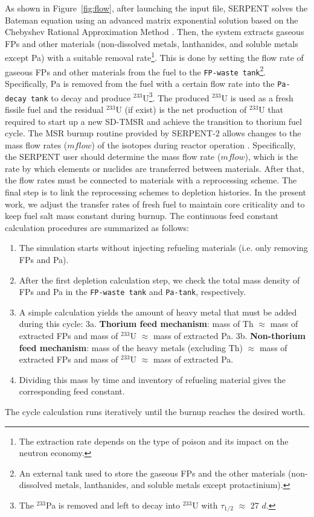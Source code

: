 As shown in Figure~\ref{fig:flow}, after launching the input file, SERPENT solves the Bateman equation using an advanced 
matrix exponential solution based on the Chebyshev Rational Approximation 
Method \cite{isotalo2016improving}. 
Then, the system extracts gaseous \gls{FPs} and other materials 
(non-dissolved metals, lanthanides, and soluble metals except Pa) with 
a suitable removal rate\footnote{The extraction rate depends on the type of 
poison and its impact on the neutron
economy.}. This is done by setting the 
flow rate of gaseous \gls{FPs} and other materials from the fuel to the 
\texttt{FP-waste tank}\footnote{An external tank used to store the gaseous 
\gls{FPs} and the other materials (non-dissolved metals, lanthanides, and 
soluble metals except protactinium).}. Specifically, Pa is removed 
from the fuel with a certain flow rate into the 
\texttt{Pa-decay tank} to decay and produce $^{233}$U\footnote{The 
$^{233}$Pa is removed and left to decay into $^{233}$U with $\tau_{1/2}$ 
$\approx$ $27$ $d$.}. The produced $^{233}$U is used as a fresh fissile fuel 
and the residual $^{233}$U (if exist) is the net production of $^{233}$U that required to start up a new SD-TMSR and achieve the transition to thorium fuel cycle. The MSR burnup 
routine provided by SERPENT-2 allows changes to the mass flow rates ($mflow$) of the 
isotopes during reactor operation \cite{aufiero2013extended}. Specifically, the SERPENT user should determine the mass flow rate ($mflow$), which is the rate by 
which elements or nuclides are transferred between materials. After that, the 
flow rates must be connected to materials with a reprocessing scheme. 
The final step is to link the reprocessing schemes to depletion histories. In 
the present work, we adjust the transfer rates of fresh fuel to maintain core 
criticality and to keep fuel salt mass constant during burnup. The continuous feed constant calculation procedures are summarized as follows:
\begin{enumerate}
	\item The simulation starts without injecting refueling materials (i.e. only removing FPs and Pa).
	\item After the first depletion calculation step, we check the total mass density of FPs and Pa in the \texttt{FP-waste tank} and \texttt{Pa-tank}, respectively.
	\item A simple calculation yields the amount of heavy metal that must be added during this cycle:
	\subitem 3a. \textbf{Thorium feed mechanism}: mass of Th $\approx$ mass of extracted FPs and mass of $^{233}$U $\approx$ mass of extracted Pa.
	\subitem 3b. \textbf{Non-thorium feed mechanism}: mass of the heavy metals (excluding Th) $\approx$ mass of extracted FPs and mass of $^{233}$U $\approx$ mass of extracted Pa.
	\item Dividing this mass by time and inventory of refueling material gives the corresponding feed constant.
\end{enumerate}
The cycle calculation runs iteratively until the burnup reaches the desired worth.

